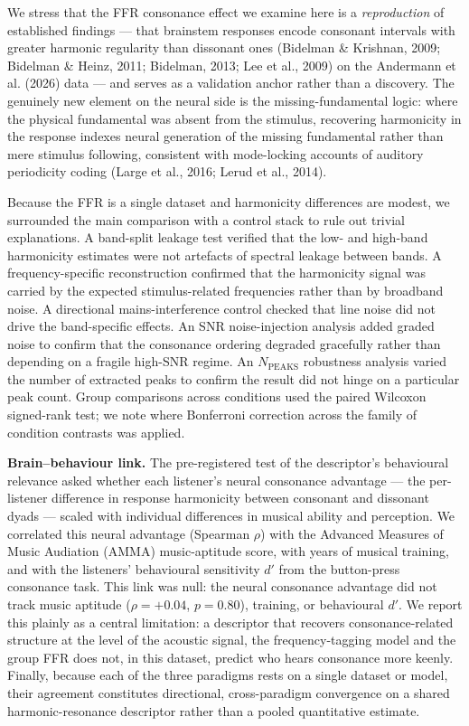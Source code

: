 \documentclass[11pt]{article}
\begin{document}
We stress that the FFR consonance effect we examine here is a \emph{reproduction} of established findings — that brainstem responses encode consonant intervals with greater harmonic regularity than dissonant ones (Bidelman \& Krishnan, 2009; Bidelman \& Heinz, 2011; Bidelman, 2013; Lee et al., 2009) on the Andermann et al. (2026) data — and serves as a validation anchor rather than a discovery. The genuinely new element on the neural side is the missing-fundamental logic: where the physical fundamental was absent from the stimulus, recovering harmonicity in the response indexes neural generation of the missing fundamental rather than mere stimulus following, consistent with mode-locking accounts of auditory periodicity coding (Large et al., 2016; Lerud et al., 2014).

Because the FFR is a single dataset and harmonicity differences are modest, we surrounded the main comparison with a control stack to rule out trivial explanations. A band-split leakage test verified that the low- and high-band harmonicity estimates were not artefacts of spectral leakage between bands. A frequency-specific reconstruction confirmed that the harmonicity signal was carried by the expected stimulus-related frequencies rather than by broadband noise. A directional mains-interference control checked that line noise did not drive the band-specific effects. An SNR noise-injection analysis added graded noise to confirm that the consonance ordering degraded gracefully rather than depending on a fragile high-SNR regime. An $N_{\mathrm{PEAKS}}$ robustness analysis varied the number of extracted peaks to confirm the result did not hinge on a particular peak count. Group comparisons across conditions used the paired Wilcoxon signed-rank test; we note where Bonferroni correction across the family of condition contrasts was applied.

\textbf{Brain–behaviour link.} The pre-registered test of the descriptor's behavioural relevance asked whether each listener's neural consonance advantage — the per-listener difference in response harmonicity between consonant and dissonant dyads — scaled with individual differences in musical ability and perception. We correlated this neural advantage (Spearman $\rho$) with the Advanced Measures of Music Audiation (AMMA) music-aptitude score, with years of musical training, and with the listeners' behavioural sensitivity $d'$ from the button-press consonance task. This link was null: the neural consonance advantage did not track music aptitude ($\rho=+0.04$, $p=0.80$), training, or behavioural $d'$. We report this plainly as a central limitation: a descriptor that recovers consonance-related structure at the level of the acoustic signal, the frequency-tagging model and the group FFR does not, in this dataset, predict who hears consonance more keenly. Finally, because each of the three paradigms rests on a single dataset or model, their agreement constitutes directional, cross-paradigm convergence on a shared harmonic-resonance descriptor rather than a pooled quantitative estimate.
\end{document}
